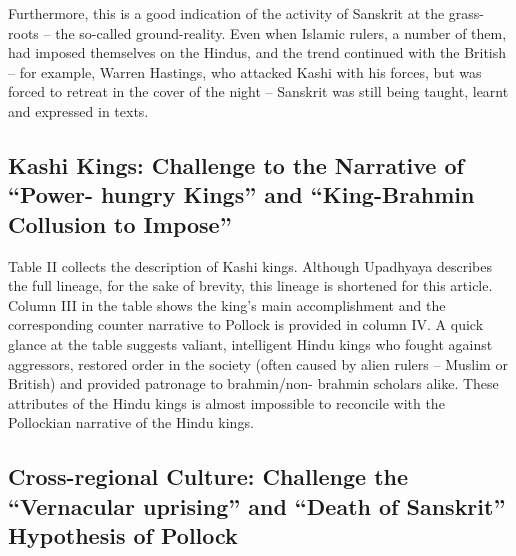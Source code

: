 \begin{enumerate}
 Furthermore, this is a good indication of the activity of Sanskrit at the grass-roots – the so-called ground-reality. Even when Islamic rulers, a number of them, had imposed themselves on the Hindus, and the trend continued with the British – for example, Warren Hastings, who attacked Kashi with his forces, but was forced to retreat in the cover of the night – Sanskrit was still being taught, learnt and expressed in texts.


\end{enumerate}


\subsection*{Kashi Kings: \hfill\break Challenge to the Narrative of “Power- hungry Kings” \hfill\break and “King-Brahmin Collusion to Impose”}

Table II collects the description of Kashi kings. Although Upadhyaya describes the full lineage, for the sake of brevity, this lineage is shortened for this article. Column III in the table shows the king’s main accomplishment and the corresponding counter narrative to Pollock is provided in column IV. A quick glance at the table suggests valiant, intelligent Hindu kings who fought against aggressors, restored order in the society (often caused by alien rulers – Muslim or British) and provided patronage to brahmin/non- brahmin scholars alike. These attributes of the Hindu kings is almost impossible to reconcile with the Pollockian narrative of the Hindu kings.

\vspace{-.3cm}

\subsection*{Cross-regional Culture: \hfill\break Challenge the “Vernacular uprising” and \hfill\break “Death of Sanskrit” Hypothesis of Pollock}

\vspace{-.2cm}

